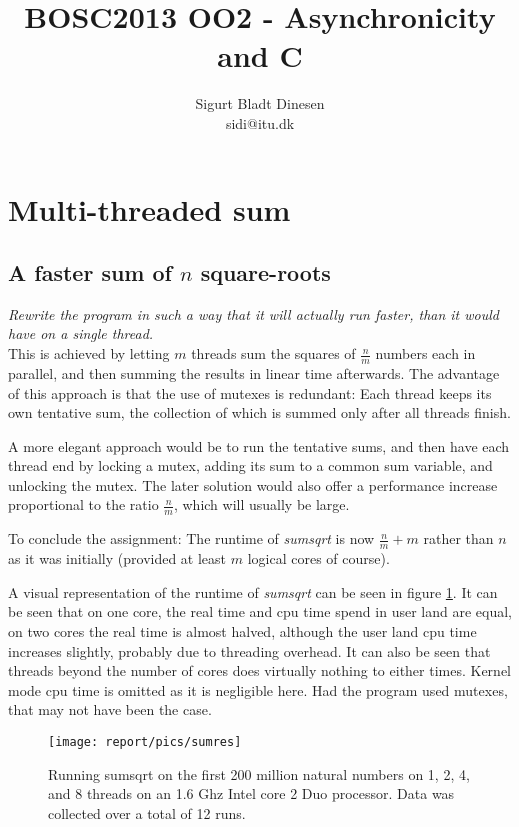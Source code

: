 \documentclass[a4paper, titlepage]{article}
\begin{document}
\title{BOSC2013 OO2 - Asynchronicity and C}
\author{Sigurt Bladt Dinesen \\sidi{@}itu.dk}
\maketitle
\section*{Multi-threaded sum}
\subsection*{A faster sum of $n$ square-roots}
\textit{Rewrite the program in such a way that it will actually run
faster, than it would have on a single thread.}\\

This is achieved by letting $m$ threads sum the squares of $\frac{n}{m}$ numbers
each in parallel, and then summing the results in linear time afterwards. The
advantage of this approach is that the use of mutexes is redundant: Each thread
keeps its own tentative sum, the collection of which is summed only after all
threads finish.

A more elegant approach would be to run the tentative sums, and
then have each thread end by locking a mutex, adding its sum to a common sum
variable, and unlocking the mutex. The later solution would also offer a performance
increase proportional to the ratio $\frac{n}{m}$, which will usually be large.

To conclude the assignment: The runtime of \emph{sumsqrt} is now
$\frac{n}{m}+m$
rather than $n$ as it was initially (provided at least $m$ logical cores of course).

A visual representation of the runtime of \emph{sumsqrt} can be seen in figure
\ref{fig:sumcores}. It can be seen that on one core, the real time and cpu time
spend in user land are equal, on two cores the real time is almost halved,
although the user land cpu time increases slightly, probably due to threading
overhead. It can also be seen that threads beyond the number of cores does
virtually nothing to either times. Kernel mode cpu time is omitted as it is
negligible here. Had the program used mutexes, that may not have been the case.

\begin{figure}[hbpt]
	\texttt{[image: report/pics/sumres]}
	\caption{Running sumsqrt on the first 200 million natural numbers on
	1, 2, 4, and 8 threads on an 1.6 Ghz Intel core 2 Duo processor.
	Data was collected over a total of 12 runs.}
	\label{fig:sumcores}
\end{figure}
\end{document}
